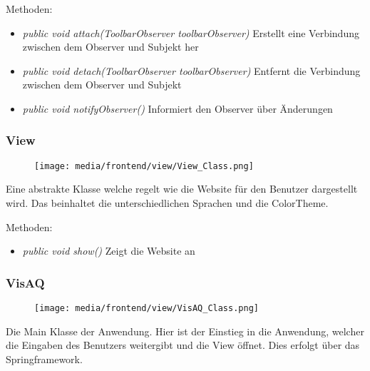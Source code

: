 Methoden:
\begin{itemize} 
    \item \emph{public void attach(ToolbarObserver toolbarObserver)} Erstellt eine Verbindung zwischen dem Observer und Subjekt her
    \item \emph{public void detach(ToolbarObserver toolbarObserver)} Entfernt die Verbindung zwischen dem Observer und Subjekt
    \item \emph{public void notifyObserver()} Informiert den Observer über Änderungen
\end{itemize}

\subsubsection{View}
\begin{minipage}{0.3\textwidth}
    \begin{figure}[H]
        \texttt{[image: media/frontend/view/View\_Class.png]}
    \end{figure}
    \end{minipage} \hfill
    \begin{minipage}{0.6\textwidth}
Eine abstrakte Klasse welche regelt wie die Website für den Benutzer dargestellt wird. Das beinhaltet die unterschiedlichen Sprachen und die ColorTheme.
\end{minipage}

Methoden:
\begin{itemize} 
    \item \emph{public void show()} Zeigt die Website an
\end{itemize}

\subsubsection{VisAQ}
\begin{minipage}{0.3\textwidth}
    \begin{figure}[H]
        \texttt{[image: media/frontend/view/VisAQ\_Class.png]}
    \end{figure}
    \end{minipage} \hfill
    \begin{minipage}{0.6\textwidth}
Die Main Klasse der Anwendung. Hier ist der Einstieg in die Anwendung, welcher die Eingaben des Benutzers weitergibt und die View öffnet. Dies erfolgt über das Springframework.
\end{minipage}

